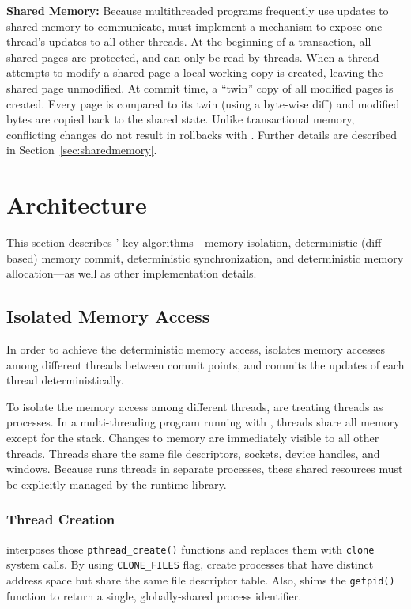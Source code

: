 
\textbf{Shared Memory:} 
Because multithreaded programs frequently use updates to shared memory to communicate, \dthreads{} must implement a mechanism to expose one thread's updates to all other threads.  At the beginning of a transaction, all shared pages are protected, and can only be read by threads.  When a thread attempts to modify a shared page a local working copy is created, leaving the shared page unmodified.  At commit time, a ``twin'' copy of all modified pages is created.  Every page is compared to its twin (using a byte-wise diff) and modified bytes are copied back to the shared state.  Unlike transactional memory, conflicting changes do not result in rollbacks with \dthreads{}.  Further details are described in Section~\ref{sec:sharedmemory}.


\section{\dthreads{} Architecture}
\label{sec:dthreads-architecture}
This section describes \dthreads{}’ key algorithms—memory isolation, deterministic (diff-based) memory commit, deterministic synchronization, and deterministic memory allocation—as well as other implementation details.

\subsection{Isolated Memory Access}
\label{sec:threadsasprocs}

In order to achieve the deterministic memory access, 
\dthreads{} isolates memory accesses among different
threads between commit points, and commits the updates of each thread deterministically.

To isolate the memory access among different threads, \dthreads{} are treating threads as processes.  In a multi-threading program running with \pthreads{}, threads share all memory except for the stack.  Changes to memory are immediately visible to all other threads.  Threads share the same file descriptors, sockets, device handles, and windows. Because \dthreads{} runs threads in separate processes, these shared resources must be explicitly managed by the runtime library.

\subsubsection{Thread Creation}
\dthreads{} interposes those \texttt{pthread\_create()} functions and replaces them with \texttt{clone} system calls. By using  \texttt{CLONE\_FILES} flag, \dthreads{} create processes that have distinct address space but share the same file descriptor table. Also, \dthreads{} shims the \texttt{getpid()} function to return a single, globally-shared process identifier. 

